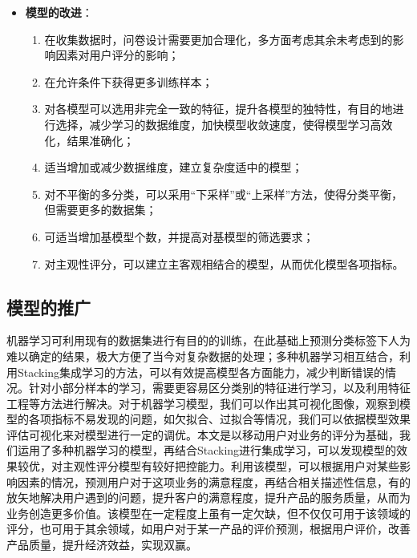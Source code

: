 \documentclass{MathorCupmodeling}
\begin{document}
\begin{itemize}
\begin{enumerate}
			\end{enumerate}
		\newpage
		\item \textbf{模型的改进}：
			\begin{enumerate}
				\item 在收集数据时，问卷设计需要更加合理化，多方面考虑其余未考虑到的影响因素对用户评分的影响；
				\item 在允许条件下获得更多训练样本；
				\item 对各模型可以选用非完全一致的特征，提升各模型的独特性，有目的地进行选择，减少学习的数据维度，加快模型收敛速度，使得模型学习高效化，结果准确化；
				\item 适当增加或减少数据维度，建立复杂度适中的模型；
				\item 对不平衡的多分类，可以采用“下采样”或“上采样”方法，使得分类平衡，但需要更多的数据集；
				\item 可适当增加基模型个数，并提高对基模型的筛选要求；
				\item 对主观性评分，可以建立主客观相结合的模型，从而优化模型各项指标。
			\end{enumerate}
	\end{itemize}
	\subsection{模型的推广}
	机器学习可利用现有的数据集进行有目的的训练，在此基础上预测分类标签下人为难以确定的结果，极大方便了当今对复杂数据的处理；多种机器学习相互结合，利用Stacking集成学习的方法，可以有效提高模型各方面能力，减少判断错误的情况。针对小部分样本的学习，需要更容易区分类别的特征进行学习，以及利用特征工程等方法进行解决。对于机器学习模型，我们可以作出其可视化图像，观察到模型的各项指标不易发现的问题，如欠拟合、过拟合等情况，我们可以依据模型效果评估可视化来对模型进行一定的调优。本文是以移动用户对业务的评分为基础，我们运用了多种机器学习的模型，再结合Stacking进行集成学习，可以发现模型的效果较优，对主观性评分模型有较好把控能力。利用该模型，可以根据用户对某些影响因素的情况，预测用户对于这项业务的满意程度，再结合相关描述性信息，有的放矢地解决用户遇到的问题，提升客户的满意程度，提升产品的服务质量，从而为业务创造更多价值。该模型在一定程度上虽有一定欠缺，但不仅仅可用于该领域的评分，也可用于其余领域，如用户对于某一产品的评价预测，根据用户评价，改善产品质量，提升经济效益，实现双赢。
\end{document}
